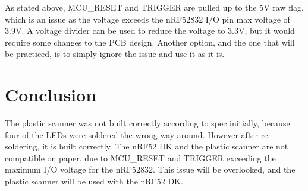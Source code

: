 \documentclass[12pt, a4paper]{article}
\begin{document}
                As stated above, MCU\_RESET and TRIGGER are pulled up to the 5V raw flag, which is an issue
                as the voltage exceeds the nRF52832 I/O pin
                max voltage of 3.9V. A voltage divider can be used to reduce the voltage to 3.3V, 
                but it would require some changes to the PCB design. Another option, and the one that
                will be practiced, is to simply ignore the issue and use it as it is.


            
    \section{Conclusion}
                The plastic scanner was not built correctly according to spec initially, because four of
                the LEDs were soldered the wrong way around. However after re-soldering, it is built correctly.
                The nRF52 DK and the plastic scanner are not compatible on paper, due to MCU\_RESET and TRIGGER
                exceeding the maximum I/O voltage for the nRF52832. This issue will be overlooked, and the plastic
                scanner will be used with the nRF52 DK. 

    \clearpage
    
    
\end{document}
